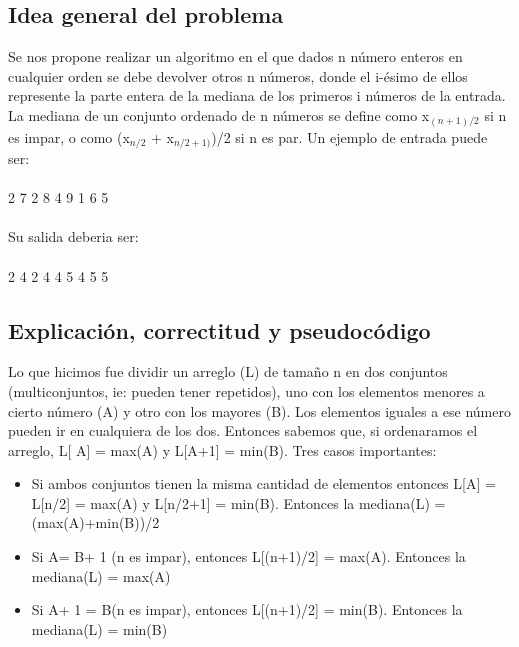 \subsection{Idea general del problema}
Se nos propone realizar un algoritmo en el que dados n número enteros en cualquier orden se debe devolver otros n números, donde el i-ésimo de ellos represente la parte entera de la mediana de los primeros i números de la entrada.
La mediana de un conjunto ordenado de n números se define como x$_{(n+1)/2}$ si n es impar, o como (x$_{n/2}$ + x$_{n/2+1)}$)/2  si n es par.
Un ejemplo de entrada puede ser: \\
\\
2 7 2 8 4 9 1 6 5 \\
\\
Su salida deberia ser: \\
\\
2 4 2 4 4 5 4 5 5

\subsection{Explicación, correctitud y pseudocódigo}

Lo que hicimos fue dividir un arreglo (L) de tamaño n en dos conjuntos (multiconjuntos, ie: pueden tener repetidos), uno con los elementos menores a cierto número (A) y otro con los mayores (B). Los elementos iguales a ese número pueden ir en cualquiera de los dos. Entonces sabemos que, si ordenaramos el arreglo, L[ \textbar A\textbar] = max(A) y L[\textbar A\textbar+1] = min(B). Tres casos importantes: 

\begin{itemize}
\item Si ambos conjuntos tienen la misma cantidad de elementos entonces L[\textbar A\textbar] = L[n/2] = max(A) y L[n/2+1] = min(B). Entonces la mediana(L) = (max(A)+min(B))/2
\item Si \textbar A\textbar = \textbar B\textbar + 1 (n es impar), entonces L[(n+1)/2] = max(A). Entonces la mediana(L) = max(A)
\item Si \textbar A\textbar + 1 = \textbar B\textbar (n es impar), entonces L[(n+1)/2] = min(B). Entonces la mediana(L) = min(B)
\end{itemize}


